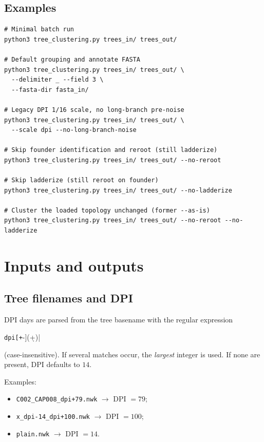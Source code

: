 \documentclass[11pt,a4paper]{article}
\begin{document}
\subsection{Examples}
\begin{lstlisting}
# Minimal batch run
python3 tree_clustering.py trees_in/ trees_out/

# Default grouping and annotate FASTA
python3 tree_clustering.py trees_in/ trees_out/ \
  --delimiter _ --field 3 \
  --fasta-dir fasta_in/

# Legacy DPI 1/16 scale, no long-branch pre-noise
python3 tree_clustering.py trees_in/ trees_out/ \
  --scale dpi --no-long-branch-noise

# Skip founder identification and reroot (still ladderize)
python3 tree_clustering.py trees_in/ trees_out/ --no-reroot

# Skip ladderize (still reroot on founder)
python3 tree_clustering.py trees_in/ trees_out/ --no-ladderize

# Cluster the loaded topology unchanged (former --as-is)
python3 tree_clustering.py trees_in/ trees_out/ --no-reroot --no-ladderize
\end{lstlisting}

\section{Inputs and outputs}

\subsection{Tree filenames and DPI}
DPI days are parsed from the tree basename with the regular expression
\begin{center}
\verb|dpi[+|-](\d+)|
\end{center}
(case-insensitive). If several matches occur, the \emph{largest} integer is used.
If none are present, DPI defaults to $14$.

Examples:
\begin{itemize}[nosep]
  \item \texttt{C002\_CAP008\_dpi+79.nwk} $\rightarrow$ DPI $=79$;
  \item \texttt{x\_dpi-14\_dpi+100.nwk} $\rightarrow$ DPI $=100$;
  \item \texttt{plain.nwk} $\rightarrow$ DPI $=14$.
\end{itemize}
\end{document}
